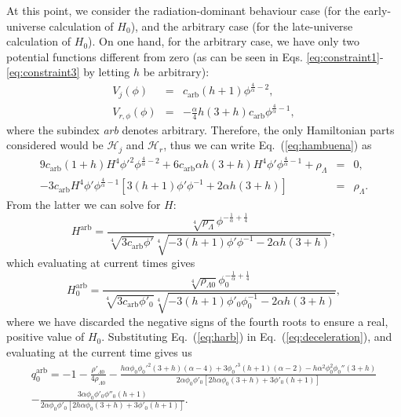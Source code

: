 \documentclass[onecolumn,superscriptaddress,secnumarabic,amssymb,amsmath,nobibnotes,aps,prd,nofootinbib,altaffilletter]{revtex4}
\newcommand{\ham}{\mathcal{H}}
\begin{document}
At this point, we consider the radiation-dominant behaviour case (for the early-universe calculation of $H_0$), and the arbitrary case (for the late-universe calculation of $H_0$). 
On one hand, for the arbitrary case, we have only two potential functions different from zero (as can be seen in Eqs. \eqref{eq:constraint1}-\eqref{eq:constraint3} by letting $h$ be arbitrary):
\begin{eqnarray}
    V_j(\phi) &=& c_{\text{arb}}(h+1)\phi^{\frac{4}{\alpha}-2},\\
    V_{r,\phi}(\phi) &=& -\frac{\alpha}{4}h(3+h)c_{\text{arb}}\phi^{\frac{4}{\alpha}-1},
\end{eqnarray}
where the subindex \textit{arb} denotes arbitrary.
Therefore, the only Hamiltonian parts considered would be $\ham_j$ and $\ham_r$, thus we can write Eq.~(\ref{eq:hambuena}) as
\begin{eqnarray}
9c_{\text{arb}}(1+h)H^4{\phi'}^2\phi^{\frac{4}{\alpha}-2}+6c_{\text{arb}}\alpha h(3+h)H^4\phi'\phi^{\frac{4}{\alpha}-1}+\rho_\Lambda &=&0, \\
-3c_{\text{arb}}H^4\phi' \phi^{\frac{4}{\alpha}-1}\left[3(h+1)\phi'\phi^{-1} + 2\alpha h(3+h)\right]&=&\rho_\Lambda.
    \label{eq:hamarbitrario}
\end{eqnarray}
From the latter we can solve for $H$:
\begin{equation}
    H^{\text{arb}}=\frac{\sqrt[4]{\rho_\Lambda}\phi^{-\frac{1}{\alpha}+\frac{1}{4}}}{\sqrt[4]{3c_{\text{arb}}\phi'}\sqrt[4]{-3(h+1)\phi'\phi^{-1} - 2\alpha h(3+h)}},
    \label{eq:harb}
\end{equation}
which evaluating at current times gives
\begin{equation}
    H_0^{\text{arb}}=\frac{\sqrt[4]{\rho_{\Lambda 0}}\phi_0^{-\frac{1}{\alpha}+\frac{1}{4}}}{\sqrt[4]{3c_{\text{arb}}\phi'_0}\sqrt[4]{-3(h+1)\phi'_0 \phi_0^{-1} - 2\alpha h(3+h)}}
    \label{eq:h0arb},
\end{equation}
where we have discarded the negative signs of the fourth roots to ensure a real, positive value of $H_0$.
Substituting Eq.~(\ref{eq:harb}) in Eq.~(\ref{eq:deceleration}), and evaluating at the current time gives us
\begin{align}
q_0^{\text{arb}} = -1-\frac{\rho'_{\Lambda 0}}{4\rho_{\Lambda 0}}- \frac{h\alpha\phi_0{\phi_0'}^2(3+h)(\alpha-4)+3{\phi_0'}^3(h+1)(\alpha-2)-h\alpha^2\phi_0^2\phi_0''(3+h)}{2\alpha\phi_0\phi'_0\left[2h\alpha \phi_0(3+h) + 3\phi'_0(h+1)\right]}\nonumber\\
    -\frac{3\alpha\phi_0 \phi'_0 \phi''_0(h+1)}{2\alpha\phi_0\phi'_0\left[2h\alpha \phi_0(3+h) + 3\phi'_0(h+1)\right]}.
    \label{eq:q0arb}
\end{align}
\end{document}
